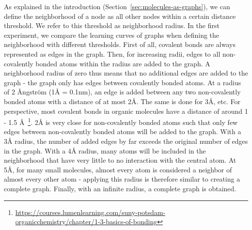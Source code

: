 As explained in the introduction (Section~\ref{sec:molecules-as-graphs}), we can define the neighborhood of a node as all other nodes within a certain distance threshold. We refer to this threshold as neighborhood radius. In the first experiment, we compare the learning curves of graphs when defining the neighborhood with different thresholds. First of all, covalent bonds are always represented as edges in the graph. Then, for increasing radii, edges to all non-covalently bonded atoms within the radius are added to the graph. A neighborhood radius of zero thus means that no additional edges are added to the graph - the graph only has edges between covalently bonded atoms. At a radius of 2 Ångström (1Å = 0.1nm), an edge is added between any two non-covalently bonded atoms with a distance of at most 2Å. The same is done for 3Å, etc. For perspective, most covalent bonds in organic molecules have a distance of around 1 - 1.5 Å~\footnote{\url{https://courses.lumenlearning.com/suny-potsdam-organicchemistry/chapter/1-3-basics-of-bonding}}. 2Å is very close for non-covalently bonded atoms such that only few edges between non-covalently bonded atoms will be added to the graph. With a 3Å radius, the number of added edges by far exceeds the original number of edges in the graph. With a 4Å radius, many atoms will be included in the neighborhood that have very little to no interaction with the central atom. At 5Å, for many small molecules, almost every atom is considered a neighbor of almost every other atom - applying this radius is therefore similar to creating a complete graph. Finally, with an infinite radius, a complete graph is obtained.

